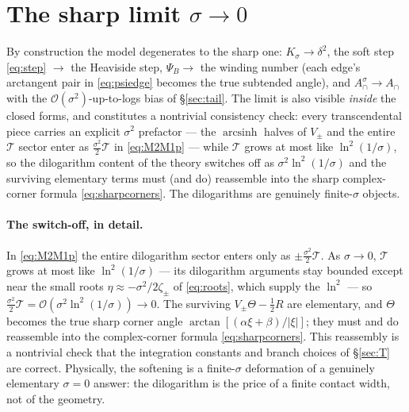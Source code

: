 \documentclass[11pt]{article}
\newcommand{\atan}{\operatorname{arctan}}
\newcommand{\asinh}{\operatorname{arcsinh}}
\newcommand{\Acap}{A^{\sigma}_{\cap}}
\begin{document}
\section{The sharp limit $\sigma\to0$}
\label{sec:sharplimit}

By construction the model degenerates to the sharp one: $K_\sigma\to\delta^2$, the
soft step \eqref{eq:step} $\to$ the Heaviside step, $\Psi_B\to$ the winding number
(each edge's arctangent pair in \eqref{eq:psiedge} becomes the true subtended
angle), and $\Acap\to A_\cap$ with the $\mathcal O(\sigma^2)$-up-to-logs bias of
\S\ref{sec:tail}.  The limit is also visible \emph{inside} the closed forms, and
constitutes a nontrivial consistency check: every transcendental piece carries an
explicit $\sigma^2$ prefactor --- the $\asinh$ halves of $V_\pm$ and the entire
$\mathcal T$ sector enter as $\tfrac{\sigma^2}{2}\mathcal T$ in \eqref{eq:M2M1p} ---
while $\mathcal T$ grows at most like $\ln^2(1/\sigma)$, so the dilogarithm content
of the theory switches off as $\sigma^2\ln^2(1/\sigma)$ and the surviving elementary
terms must (and do) reassemble into the sharp complex-corner formula
\eqref{eq:sharpcorners}.  The dilogarithms are genuinely finite-$\sigma$ objects.

\paragraph{The switch-off, in detail.}  In \eqref{eq:M2M1p} the entire dilogarithm
sector enters only as $\pm\tfrac{\sigma^2}{2}\mathcal T$.  As $\sigma\to0$, $\mathcal T$
grows at most like $\ln^2(1/\sigma)$ --- its dilogarithm arguments stay bounded except
near the small roots $\eta\approx-\sigma^2/2\zeta_\pm$ of \eqref{eq:roots}, which supply
the $\ln^2$ --- so $\tfrac{\sigma^2}{2}\mathcal T=\mathcal O(\sigma^2\ln^2(1/\sigma))
\to0$.  The surviving $V_\pm\Theta-\tfrac12 R$ are elementary, and $\Theta$ becomes the
true sharp corner angle $\atan[(\alpha\xi+\beta)/|\xi|]$; they must and do reassemble
into the complex-corner formula \eqref{eq:sharpcorners}.  This reassembly is a
nontrivial check that the integration constants and branch choices of \S\ref{sec:T} are
correct.  Physically, the softening is a finite-$\sigma$ deformation of a genuinely
elementary $\sigma=0$ answer: the dilogarithm is the price of a finite contact width,
not of the geometry.
\end{document}
